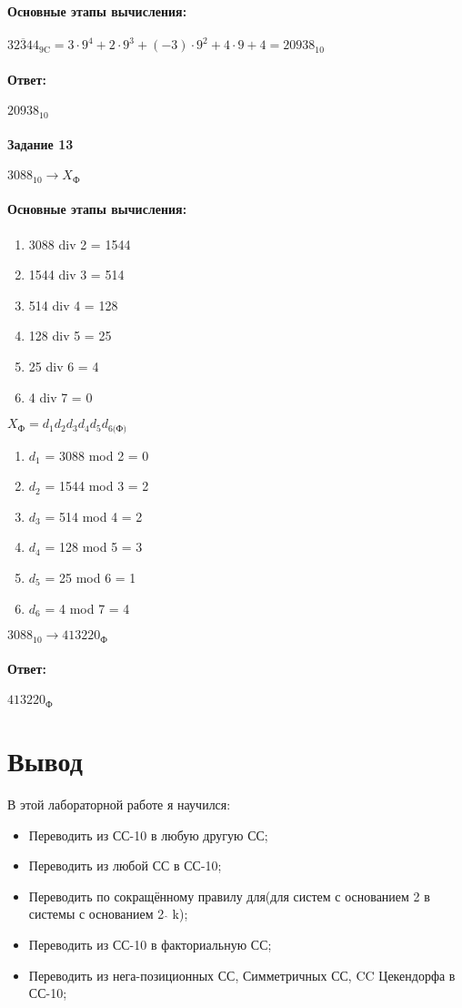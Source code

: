 \paragraph{Основные этапы вычисления:}
\hfill \break

$32\overline{3}44_\text{9C} = 3\cdot9^{4}+2\cdot9^{3}+(-3)\cdot9^{2}+4\cdot9+4=20938_{10}$

\paragraph{Ответ:}
$20938_{10}$

\paragraph{Задание 13}
$3088_{10} \rightarrow X_\text{Ф}$

\paragraph{Основные этапы вычисления:}
\hfill \break
\begin{enumerate}
\item 3088 div 2 = 1544
\item 1544 div 3 = 514
\item 514 div 4 = 128
\item 128 div 5 = 25
\item 25 div 6 = 4
\item 4 div 7 = 0
\end{enumerate}
$X_\text{Ф} = d_1d_2d_3d_4d_5d_\text{6(Ф)}$
\begin{enumerate}
\item $d_{1}$ = 3088 mod 2 = 0
\item $d_{2}$ = 1544 mod 3 = 2
\item $d_{3}$ = 514 mod 4 = 2
\item $d_{4}$ = 128 mod 5 = 3
\item $d_{5}$ = 25 mod 6 = 1
\item $d_{6}$ = 4 mod 7 = 4
\end{enumerate}
$3088_{10} \rightarrow 413220_\text{Ф}$

\paragraph{Ответ:}
$413220_\text{Ф}$
\section{Вывод}
В этой лабораторной работе я научился:
\begin{itemize}
\item Переводить из СС-10 в любую другую СС;
\item Переводить из любой СС в СС-10;
\item Переводить по сокращённому правилу для(для систем с основанием 2 в системы с основанием 2 $\widehat{}$ k);
\item Переводить из СС-10 в факториальную СС;
\item Переводить из нега-позиционных СС, Симметричных СС, CC Цекендорфа в СС-10;
\end{itemize}